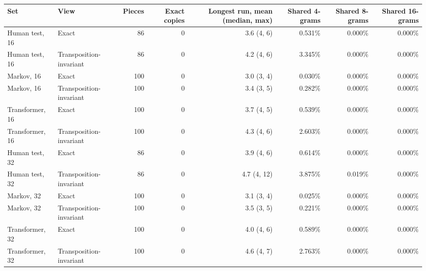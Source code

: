 \begin{tabular}{llrrrrrr}
\toprule
Set & View & Pieces & Exact copies & Longest run, mean (median, max) & Shared 4-grams & Shared 8-grams & Shared 16-grams \\
\midrule
Human test, 16 & Exact & 86 & 0 & 3.6 (4, 6) & 0.531\% & 0.000\% & 0.000\% \\
Human test, 16 & Transposition-invariant & 86 & 0 & 4.2 (4, 6) & 3.345\% & 0.000\% & 0.000\% \\
Markov, 16 & Exact & 100 & 0 & 3.0 (3, 4) & 0.030\% & 0.000\% & 0.000\% \\
Markov, 16 & Transposition-invariant & 100 & 0 & 3.4 (3, 5) & 0.282\% & 0.000\% & 0.000\% \\
Transformer, 16 & Exact & 100 & 0 & 3.7 (4, 5) & 0.539\% & 0.000\% & 0.000\% \\
Transformer, 16 & Transposition-invariant & 100 & 0 & 4.3 (4, 6) & 2.603\% & 0.000\% & 0.000\% \\
Human test, 32 & Exact & 86 & 0 & 3.9 (4, 6) & 0.614\% & 0.000\% & 0.000\% \\
Human test, 32 & Transposition-invariant & 86 & 0 & 4.7 (4, 12) & 3.875\% & 0.019\% & 0.000\% \\
Markov, 32 & Exact & 100 & 0 & 3.1 (3, 4) & 0.025\% & 0.000\% & 0.000\% \\
Markov, 32 & Transposition-invariant & 100 & 0 & 3.5 (3, 5) & 0.221\% & 0.000\% & 0.000\% \\
Transformer, 32 & Exact & 100 & 0 & 4.0 (4, 6) & 0.589\% & 0.000\% & 0.000\% \\
Transformer, 32 & Transposition-invariant & 100 & 0 & 4.6 (4, 7) & 2.763\% & 0.000\% & 0.000\% \\
\bottomrule
\end{tabular}
